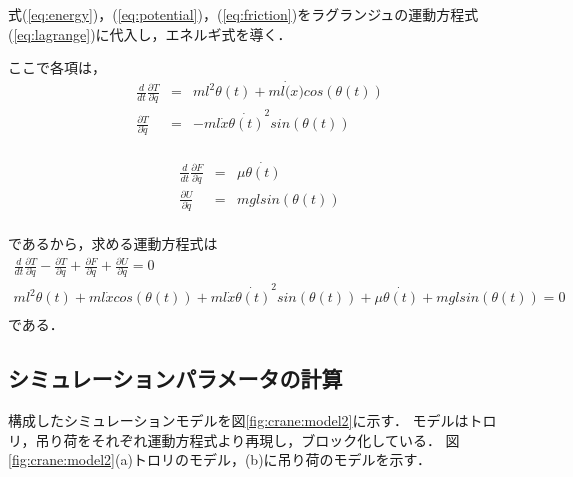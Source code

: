 \documentclass[dvipdfmx,titlepage,a4j]{jsarticle}  %
\begin{document}
式(\ref{eq:energy})，(\ref{eq:potential})，(\ref{eq:friction})をラグランジュの運動方程式(\ref{eq:lagrange})に代入し，エネルギ式を導く．

ここで各項は，
\begin{eqnarray}
  \frac{d}{dt} \frac{\partial T}{\partial \dot{q}} &=& m l^2 \theta(t) + m l \dot(x) cos(\theta(t)) \nonumber \\
  \frac{\partial T}{\partial \dot{q}} &=&  -m l \dot x \dot{\theta(t)}^2 sin(\theta(t))\nonumber \\
\end{eqnarray}

\begin{eqnarray}
  \frac{d}{dt} \frac{\partial F}{\partial \dot{q}} &=&  \mu \dot{\theta(t)} \nonumber \\
  \frac{\partial U}{\partial \dot{q}} &=&  mgl sin(\theta(t)) \nonumber \\
\end{eqnarray}

であるから，求める運動方程式は
\begin{eqnarray}
  \frac{d}{dt} \frac{\partial T}{\partial \dot{q}} - \frac{\partial T}{\partial q} + \frac{\partial F}{\partial \dot q} + \frac{\partial U}{\partial \dot q} = 0 \nonumber \\
  m l^2 \theta(t) + m l \dot x cos(\theta(t)) + m l \dot x \dot{\theta(t)}^2 sin(\theta(t)) + \mu \dot{\theta(t)} + mgl sin(\theta(t)) = 0 \nonumber \\
\end{eqnarray}
である．

\subsection{シミュレーションパラメータの計算}
構成したシミュレーションモデルを図\ref{fig:crane:model2}に示す．
モデルはトロリ，吊り荷をそれぞれ運動方程式より再現し，ブロック化している．
図\ref{fig:crane:model2}(a)トロリのモデル，(b)に吊り荷のモデルを示す．
\end{document}
